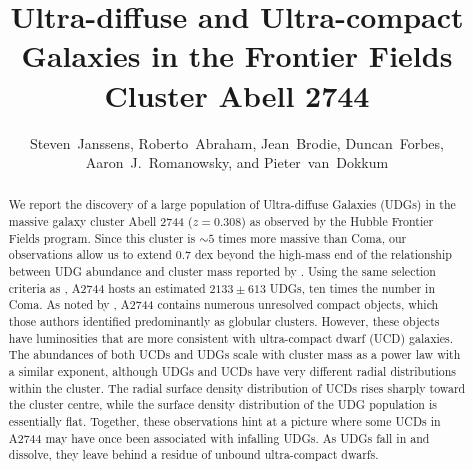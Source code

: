 \documentclass[iop,tighten,twocolumn,apj]{emulateapj}
\begin{document}
\title{Ultra-diffuse and Ultra-compact Galaxies in the Frontier Fields Cluster
Abell 2744}

\author{Steven~Janssens, Roberto~Abraham,
Jean~Brodie, Duncan~Forbes,
Aaron~J.~Romanowsky, and Pieter~van~Dokkum}




\begin{abstract}
We report the discovery of a large population of Ultra-diffuse Galaxies (UDGs)
in the massive galaxy cluster Abell 2744 ($z=0.308$) as observed by the Hubble
Frontier Fields program. Since this cluster is $\sim5$ times more massive than
Coma, our observations allow us to extend 0.7 dex beyond the high-mass end of
the relationship between UDG abundance and cluster mass reported by
\cite{vdb2016}. Using the same selection criteria as \cite{vdb2016}, A2744
hosts an estimated $2133 \pm 613$ UDGs, ten times the number in Coma. As noted
by \cite{lee2016}, A2744 contains numerous unresolved compact objects, which
those authors identified predominantly as globular clusters.  However, these
objects  have luminosities that are more consistent with ultra-compact dwarf
(UCD) galaxies.  The abundances of both UCDs and UDGs scale with cluster mass
as a power law with a similar exponent, although UDGs and UCDs have very
different radial distributions within the cluster. The radial surface density
distribution of UCDs rises sharply toward the cluster centre, while the
surface density distribution of the UDG population is essentially flat.
Together, these observations hint at a picture where some UCDs in A2744 may
have once been associated with infalling UDGs. As UDGs fall in and dissolve,
they leave behind a residue of unbound ultra-compact dwarfs.
\end{abstract}
\end{document}
